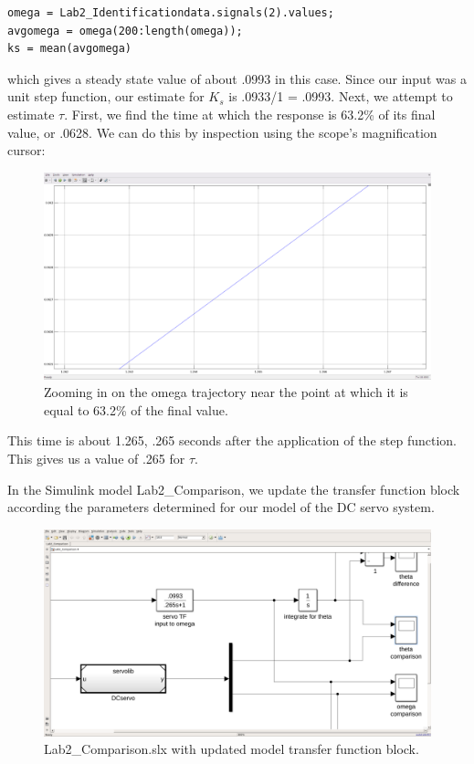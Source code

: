 \documentclass[11pt,a4paper]{article}
\begin{document}
\begin{verbatim}
omega = Lab2_Identificationdata.signals(2).values;
avgomega = omega(200:length(omega));
ks = mean(avgomega)
\end{verbatim}

which gives a steady state value of about .0993 in this case. Since our input was a unit step function, our estimate for $K_{s}$ is .0933/1 = .0993. Next, we attempt to estimate $\tau$. First, we find the time at which the response is 63.2\% of its final value, or .0628. We can do this by inspection using the scope's magnification cursor:

\begin{figure}[H]
\includegraphics[width=\textwidth]{imglab/lab2sol_identification2white.png}
\caption{Zooming in on the omega trajectory near the point at which it is equal to 63.2\% of the final value. }
\label{fig:id2}
\end{figure}

This time is about 1.265, .265 seconds after the application of the step function. This gives us a value of .265 for $\tau$.

In the Simulink model Lab2\_Comparison, we update the transfer function block according the parameters determined for our model of the DC servo system.

\begin{figure}[H]
\includegraphics[width=\textwidth]{imglab/lab2sol_comp1.png}
\caption{Lab2\_Comparison.slx with updated model transfer function block. }
\label{fig:comp1}
\end{figure}
\end{document}
